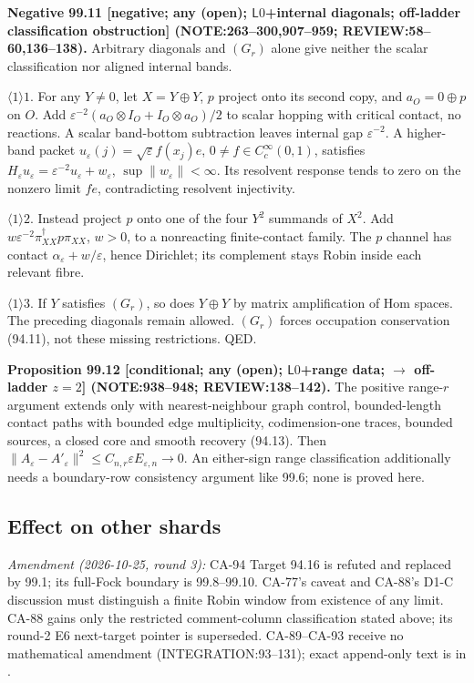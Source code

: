 \textbf{Negative 99.11 [negative; any (open); \(\mathsf L0\)+internal diagonals; off-ladder classification obstruction]
(NOTE:263--300,907--959; REVIEW:58--60,136--138).}
Arbitrary diagonals and \((G_r)\) alone give neither the scalar classification nor aligned internal bands.
\par\(\langle1\rangle1\). For any \(Y\ne0\), let \(X=Y\oplus Y\), \(p\) project onto its second copy, and \(a_O=0\oplus p\)
on \(O\). Add \(\varepsilon^{-2}(a_O\otimes I_O+I_O\otimes a_O)/2\) to scalar hopping with critical contact, no reactions.
A scalar band-bottom subtraction leaves internal gap \(\varepsilon^{-2}\). A higher-band packet
\(u_\varepsilon(j)=\sqrt\varepsilon f(x_j)e\), \(0\ne f\in C_c^\infty(0,1)\), satisfies
\(H_\varepsilon u_\varepsilon=\varepsilon^{-2}u_\varepsilon+w_\varepsilon\), \(\sup\|w_\varepsilon\|<\infty\).
Its resolvent response tends to zero on the nonzero limit \(fe\), contradicting resolvent injectivity.
\par\(\langle1\rangle2\). Instead project \(p\) onto one of the four \(Y^2\) summands of \(X^2\). Add
\(w\varepsilon^{-2}\pi_{XX}^\dagger p\pi_{XX}\), \(w>0\), to a nonreacting finite-contact family.
The \(p\) channel has contact \(\alpha_\varepsilon+w/\varepsilon\), hence Dirichlet; its complement stays Robin inside each relevant fibre.
\par\(\langle1\rangle3\). If \(Y\) satisfies \((G_r)\), so does \(Y\oplus Y\) by matrix amplification of Hom spaces.
The preceding diagonals remain allowed. \((G_r)\) forces occupation conservation (94.11), not these missing restrictions. QED.

\textbf{Proposition 99.12 [conditional; any (open); \(\mathsf L0\)+range data; \(\to\) off-ladder \(z=2\)]
(NOTE:938--948; REVIEW:138--142).}
The positive range-\(r\) argument extends only with nearest-neighbour graph control, bounded-length contact paths with
bounded edge multiplicity, codimension-one traces, bounded sources, a closed core and smooth recovery (94.13).
Then \(\|A_\varepsilon-A'_\varepsilon\|^2\le C_{n,r}\varepsilon E_{\varepsilon,n}\to0\).
An either-sign range classification additionally needs a boundary-row consistency argument like 99.6; none is proved here.

\subsection{Effect on other shards}
\emph{Amendment (2026-10-25, round 3):} CA-94 Target 94.16 is refuted and replaced by 99.1; its full-Fock boundary is
99.8--99.10. CA-77's caveat and CA-88's D1-C discussion must distinguish a finite Robin window from existence of any limit.
CA-88 gains only the restricted comment-column classification stated above; its round-2 E6 next-target pointer is superseded.
CA-89--CA-93 receive no mathematical amendment (INTEGRATION:93--131); exact append-only text is in .

